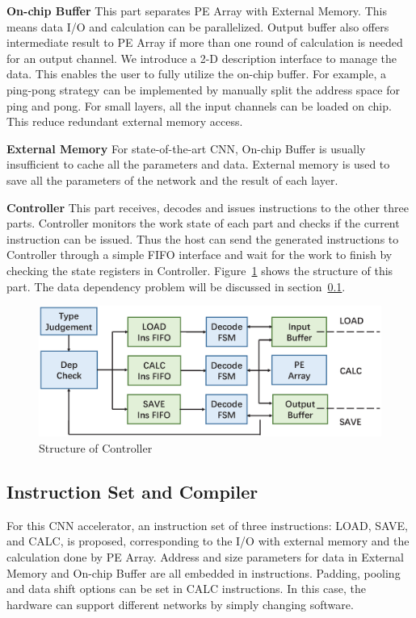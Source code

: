 \documentclass[10pt, conference, compsocconf]{IEEEtran}
\begin{document}
\textbf{On-chip Buffer} This part separates PE Array with External Memory. This means data I/O and calculation can be parallelized. Output buffer also offers intermediate result to PE Array if more than one round of calculation is needed for an output channel. We introduce a 2-D description interface to manage the data. This enables the user to fully utilize the on-chip buffer. For example, a ping-pong strategy can be implemented by manually split the address space for ping and pong. For small layers, all the input channels can be loaded on chip. This reduce redundant external memory access.

\textbf{External Memory} For state-of-the-art CNN, On-chip Buffer is usually insufficient to cache all the parameters and data. External memory is used to save all the parameters of the network and the result of each layer.

\textbf{Controller} This part receives, decodes and issues instructions to the other three parts. Controller monitors the work state of each part and checks if the current instruction can be issued. Thus the host can send the generated instructions to Controller through a simple FIFO interface and wait for the work to finish by checking the state registers in Controller.  Figure~\ref{fig:controller} shows the structure of this part. The data dependency problem will be discussed in section~\ref{sec:ins_comp}.

\begin{figure}[t]
    \centering
    \includegraphics[width=1.0\columnwidth]{figure/controller.eps}
    \small
    \caption{Structure of Controller}
    \label{fig:controller}
\end{figure}

\subsection{Instruction Set and Compiler} \label{sec:ins_comp}
For this CNN accelerator, an instruction set of three instructions: LOAD, SAVE, and CALC, is proposed, corresponding to the I/O with external memory and the calculation done by PE Array. Address and size parameters for data in External Memory and On-chip Buffer are all embedded in instructions. Padding, pooling and data shift options can be set in CALC instructions. In this case, the hardware can support different networks by simply changing software.
\end{document}
